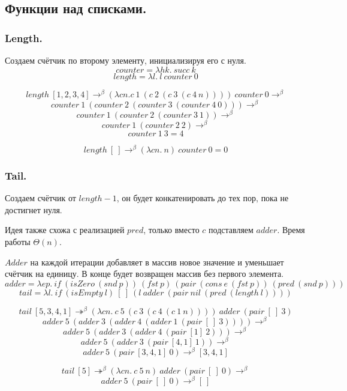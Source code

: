 \documentclass[a4paper,12pt]{article}
\theoremstyle{plain} %
\theoremstyle{definition} %
\theoremstyle{remark} %
\begin{document}
\subsection{Функции над списками.}

\subsubsection{Length.}
Создаем счётчик по второму элементу, инициализируя его с нуля.
$$counter = \lambda h k. \ succ \ k$$
$$length = \lambda l. \ l \ counter \ 0$$

$$length \ [1, 2, 3, 4] \rightarrow^{\beta} (\lambda cn. c \ 1 \ (c \ 2 \ (c \ 3 \ (c \ 4 \ n)))) \ counter \ 0 \rightarrow^{\beta}$$
$$counter \ 1 \ (counter \ 2 \ (counter \ 3 \ (counter \ 4 \ 0))) \rightarrow^{\beta}$$
$$counter \ 1 \ (counter \ 2 \ (counter \ 3 \ 1)) \rightarrow^{\beta}$$
$$counter \ 1 \ (counter \ 2 \ 2) \rightarrow^{\beta}$$
$$counter \ 1 \ 3 = 4$$

$$length \ [ \ ] \rightarrow^{\beta} (\lambda cn. \ n) \ counter \ 0 = 0$$

\subsubsection{Tail.}
Создаем счётчик от $length - 1$, он будет конкатенировать до тех пор, пока не достигнет нуля. 

Идея также схожа с реализацией $pred$, только вместо $c$ подставляем $adder$. Время работы $\Theta (n)$.

$Adder$ на каждой итерации добавляет в массив новое значение и уменьшает счётчик на единицу. В конце будет возвращен массив без первого элемента.
$$adder = \lambda e p. \ if \ (isZero \ (snd \ p)) \ (fst \ p) \  (pair \ (cons \ e \ (fst \ p)) \ (pred \ (snd \ p)))$$
$$tail = \lambda l. \ if \ (isEmpty \ l) \ [ \ ] \ ( l \ adder \ (pair \ nil \ (pred \  (length \ l)))) $$

$$tail \ [5, 3, 4, 1] \twoheadrightarrow^{\beta} (\lambda c n. \ c \ 5 \ (c \ 3 \ (c \ 4 \ (c \ 1 \ n)))) \  adder \ (pair \ [ \ ] \ 3)$$
$$ adder \ 5 \ (adder \ 3 \ (adder \ 4 \ (adder \ 1 \ (pair \ [ \ ] \ 3)))) \rightarrow^{\beta}$$
$$ adder \ 5 \ (adder \ 3 \ (adder \ 4 \ (pair \ [ 1 ] \ 2))) \rightarrow^{\beta}$$
$$ adder \ 5 \ (adder \ 3 \ (pair \ [ 4, 1 ] \ 1)) \rightarrow^{\beta}$$
$$ adder \ 5 \ (pair \ [ 3, 4, 1 ] \ 0) \rightarrow^{\beta} [ 3, 4, 1 ]$$

$$tail \ [5] \twoheadrightarrow^{\beta} (\lambda c n. \ c \ 5 \ n) \  adder \ (pair \ [ \ ] \ 0) \rightarrow^{\beta}$$
$$adder \ 5 \ (pair \ [ \ ] \ 0) \rightarrow^{\beta} [ \ ]$$
\end{document}
